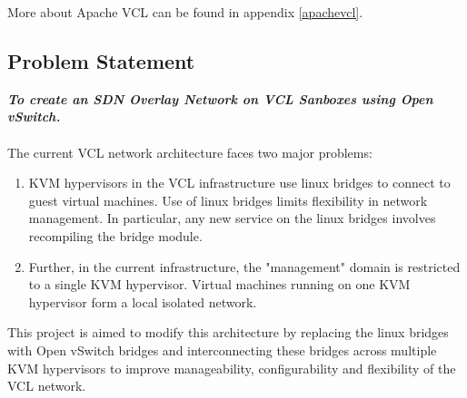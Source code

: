 \documentclass[12pt]{extarticle}
\begin{document}
More about Apache VCL can be found in appendix \ref{apachevcl}.





\subsection{Problem Statement}

\textbf{\emph{To create an SDN Overlay Network on VCL Sanboxes using Open vSwitch.}}
\\
\\
The current VCL network architecture faces two major problems:
\begin{enumerate}
    \item KVM hypervisors in the VCL infrastructure use linux bridges to connect to guest virtual machines. Use of linux bridges limits flexibility in network management. In particular, any new service on the linux bridges involves recompiling the bridge module.
    \item Further, in the current infrastructure, the "management" domain is restricted to a single KVM hypervisor. Virtual machines running on one KVM hypervisor form a local isolated network.
\end{enumerate}
  This project is aimed to modify this architecture by replacing the linux bridges with Open vSwitch bridges and interconnecting these bridges across multiple KVM hypervisors to improve manageability, configurability and flexibility of the VCL network.  

\end{document}
